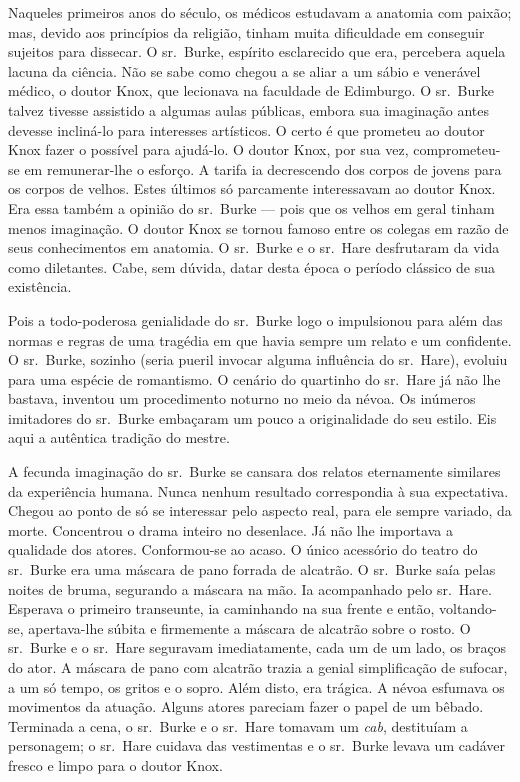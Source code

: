 Naqueles primeiros anos do século, os médicos estudavam a anatomia com
paixão; mas, devido aos princípios da religião, tinham muita dificuldade
em conseguir sujeitos para dissecar. O sr.~Burke, espírito esclarecido que
era, percebera aquela lacuna da ciência. Não se sabe como chegou a se
aliar a um sábio e venerável médico, o doutor Knox, que lecionava na
faculdade de Edimburgo. O sr.~Burke talvez tivesse assistido a algumas
aulas públicas, embora sua imaginação antes devesse incliná-lo para
interesses artísticos. O certo é que prometeu ao doutor Knox fazer o
possível para ajudá-lo. O doutor Knox, por sua vez, comprometeu-se em
remunerar-lhe o esforço. A tarifa ia decrescendo dos corpos de jovens para
os corpos de velhos. Estes últimos só parcamente interessavam ao doutor
Knox. Era essa também a opinião do sr.~Burke --- pois que os velhos em geral
tinham menos imaginação. O doutor Knox se tornou famoso entre os colegas
em razão de seus conhecimentos em anatomia. O sr.~Burke e o sr.~Hare
desfrutaram da vida como diletantes. Cabe, sem dúvida, datar desta época o
período clássico de sua existência.

Pois a todo-poderosa genialidade do sr.~Burke logo o impulsionou para além
das normas e regras de uma tragédia em que havia sempre um relato e um
confidente. O sr.~Burke, sozinho (seria pueril invocar alguma influência
do sr.~Hare), evoluiu para uma espécie de romantismo. O cenário do
quartinho do sr.~Hare já não lhe bastava, inventou um procedimento noturno
no meio da névoa. Os inúmeros imitadores do sr.~Burke embaçaram um pouco a
originalidade do seu estilo. Eis aqui a autêntica tradição do mestre.

A fecunda imaginação do sr.~Burke se cansara dos relatos eternamente
similares da experiência humana. Nunca nenhum resultado correspondia à sua
expectativa. Chegou ao ponto de só se interessar pelo aspecto real, para
ele sempre variado, da morte. Concentrou o drama inteiro no desenlace. Já
não lhe importava a qualidade dos atores. Conformou-se ao acaso. O único
acessório do teatro do sr.~Burke era uma máscara de pano forrada de
alcatrão. O sr.~Burke saía pelas noites de bruma, segurando a máscara na
mão. Ia acompanhado pelo sr.~Hare. Esperava o primeiro transeunte, ia
caminhando na sua frente e então, voltando-se, apertava-lhe súbita e
firmemente a máscara de alcatrão sobre o rosto. O sr.~Burke e o sr.~Hare
seguravam imediatamente, cada um de um lado, os braços do ator. A máscara
de pano com alcatrão trazia a genial simplificação de sufocar, a um só
tempo, os gritos e o sopro. Além disto, era trágica. A névoa esfumava os
movimentos da atuação. Alguns atores pareciam fazer o papel de um bêbado.
Terminada a cena, o sr.~Burke e o sr.~Hare tomavam um \textit{cab},
destituíam a personagem; o sr.~Hare cuidava das vestimentas e o sr.~Burke
levava um cadáver fresco e limpo para o doutor Knox.

